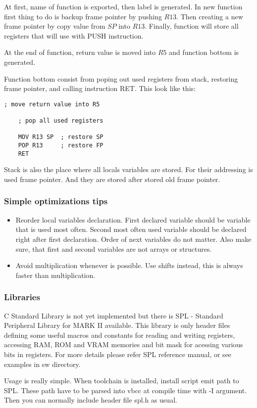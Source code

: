 At first, name of function is exported, then label is generated. In new function
first thing to do is backup frame pointer by pushing $R13$. Then creating a new
frame pointer by copy value from $SP$ into $R13$. Finally, function will store all
registers that will use with PUSH instruction.

At the end of function, return value is moved into $R5$ and function bottom is
generated.

Function bottom consist from poping out used registers from stack, restoring frame pointer,
and calling instruction RET. This look like this:

\begin{lstlisting}[language={[markII]Assembler}, frame=single]
    ; move return value into R5

    ; pop all used registers

    MOV R13 SP  ; restore SP
    POP R13     ; restore FP
    RET
\end{lstlisting}

Stack is also the place where all locals variables are stored. For their addressing
is used frame pointer. And they are stored after stored old frame pointer.

\subsubsection{Simple optimizations tips}

\begin{itemize}

    \item
    Reorder local variables declaration. First declared variable should be
    variable that is used most often. Second most often used variable should be
    declared right after first declaration. Order of next variables do not
    matter. Also make sure, that first and second variables are not arrays or
    structures.

    \item
    Avoid multiplication whenever is possible. Use shifts instead, this is
    always faster than multiplication.

\end{itemize}

\subsubsection{Libraries}

C Standard Library is not yet implemented but there is SPL - Standard
Peripheral Library for MARK II available. This library is only header files
defining some useful macros and constants for reading and writing registers,
accessing RAM, ROM and VRAM memories and bit mask for acessing various bits in
registers. For more details please refer SPL reference manual, or see examples
in sw directory.

Usage is really simple. When toolchain is installed, install script emit path to
SPL. These path have to be parsed into vbcc at compile time with -I argument.
Then you can normally include header file spl.h as usual.
